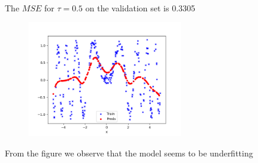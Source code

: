\begin{answer}
\\
The $MSE$ for $\tau = 0.5$ on the validation set is 0.3305
\begin{figure}[H]
    \centering
    \includegraphics[width=0.6\textwidth]{lwr/lwr_plot.png}
\end{figure}
From the figure we observe that the model seems to be underfitting
\end{answer}
